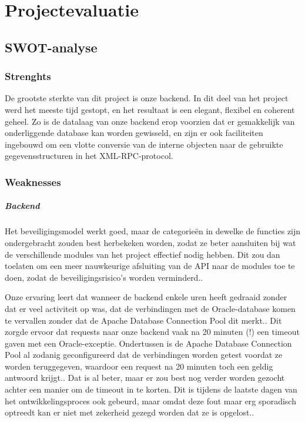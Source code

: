 \chapter{Projectevaluatie}


\section{SWOT-analyse}

\subsection{Strenghts}

De grootste sterkte van dit project is onze backend. In dit deel van het project werd het meeste tijd gestopt, en het resultaat is een elegant, flexibel en coherent geheel. 
Zo is de datalaag van onze backend erop voorzien dat er gemakkelijk van onderliggende database kan worden gewisseld, en zijn er ook faciliteiten ingebouwd om een vlotte conversie van de interne objecten naar de gebruikte gegevensstructuren in het XML-RPC-protocol.


\subsection{Weaknesses}

\paragraph{Backend} Het beveiligingsmodel werkt goed, maar de categorieën in dewelke de functies zijn ondergebracht zouden best herbekeken worden, zodat ze beter aansluiten bij wat de verschillende modules van het project effectief nodig hebben. Dit zou dan toelaten om een meer nauwkeurige afsluiting van de API naar de modules toe te doen, zodat de beveiligingsrisico's worden verminderd..

Onze ervaring leert dat wanneer de backend enkele uren heeft gedraaid zonder dat er veel activiteit op was, dat de verbindingen met de Oracle-database komen te vervallen zonder dat de Apache Database Connection Pool dit merkt.. Dit zorgde ervoor dat requests naar onze backend vaak na 20 minuten (!) een timeout gaven met een Oracle-exceptie. Ondertussen is de Apache Database Connection Pool al zodanig geconfigureerd dat de verbindingen worden getest voordat ze worden teruggegeven, waardoor een request na 20 minuten toch een geldig antwoord krijgt.. Dat is al beter, maar er zou best nog verder worden gezocht achter een manier om de timeout in te korten. Dit is tijdens de laatste dagen van het ontwikkelingsproces ook gebeurd, maar omdat deze fout maar erg sporadisch optreedt kan er niet met zekerheid gezegd worden dat ze is opgelost..

